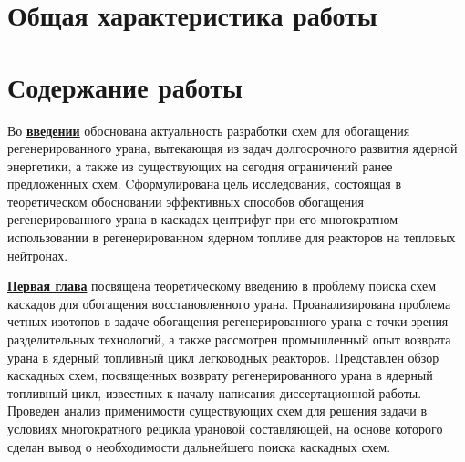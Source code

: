 \section*{Общая характеристика работы}

\newcommand{\actuality}{\underline{\textbf{\actualityTXT}}}
\newcommand{\progress}{\underline{\textbf{\progressTXT}}}
\newcommand{\aim}{\underline{{\textbf\aimTXT}}}
\newcommand{\tasks}{\underline{\textbf{\tasksTXT}}}
\newcommand{\novelty}{\underline{\textbf{\noveltyTXT}}}
\newcommand{\influence}{\underline{\textbf{\influenceTXT}}}
\newcommand{\methods}{\underline{\textbf{\methodsTXT}}}
\newcommand{\defpositions}{\underline{\textbf{\defpositionsTXT}}}
\newcommand{\reliability}{\underline{\textbf{\reliabilityTXT}}}
\newcommand{\probation}{\underline{\textbf{\probationTXT}}}
\newcommand{\contribution}{\underline{\textbf{\contributionTXT}}}
\newcommand{\publications}{\underline{\textbf{\publicationsTXT}}}


\section*{Содержание работы}
Во \underline{\textbf{введении}} обоснована актуальность разработки схем для обогащения регенерированного урана, вытекающая из задач долгосрочного развития ядерной энергетики, а также из существующих на сегодня ограничений ранее предложенных схем. Cформулирована цель исследования, состоящая в теоретическом обосновании эффективных способов обогащения регенерированного урана в каскадах цен­трифуг при его многократном использовании в регенерированном ядерном топливе для реакторов на тепловых нейтронах.

\underline{\textbf{Первая глава}} посвящена теоретическому введению в проблему поиска схем каскадов для обогащения восстановленного урана. Проанализирована проблема четных изотопов в задаче обогащения регенерированного урана с точки зрения разделительных технологий, а также рассмотрен промышленный опыт возврата урана в ядерный топливный цикл легководных реакторов. Представлен обзор каскадных схем, посвященных возврату регенерированного урана в ядерный топливный цикл, известных к началу написания диссертационной работы. Проведен анализ применимости существующих схем для решения задачи в условиях многократного рецикла урановой составляющей, на основе которого сделан вывод о необходимости дальнейшего поиска каскадных схем.

